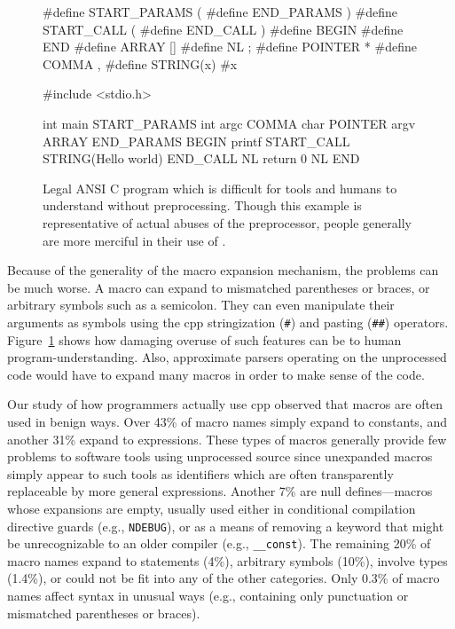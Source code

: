 \documentclass{article}
\newcommand{\Cpp}{\mbox{\textsf{cpp}}}
\newcommand{\C}{\mbox{C}}
\newcommand{\eg}{e.g.,}
\begin{document}
\begin{figure}[hbtp]
\begin{center}
\begin{small}
\begin{pseudocode}[5.5in]
#define START_PARAMS (
#define END_PARAMS )
#define START_CALL (
#define END_CALL )
#define BEGIN {
#define END }
#define ARRAY []
#define NL ;
#define POINTER *
#define COMMA ,
#define STRING(x) #x

#include <stdio.h>

int main START_PARAMS int argc COMMA char POINTER argv ARRAY END_PARAMS BEGIN
  printf START_CALL STRING(Hello world\n) END_CALL NL
  return 0 NL
END
\end{pseudocode}
\end{small}
\caption{Legal ANSI \C{} program which is difficult for tools and humans
  to understand without preprocessing.  Though this example is
  representative of actual abuses of the preprocessor, people generally
  are more merciful in their use of \cpp{}.}
\label{fig:worstcase}
\end{center}
\end{figure}

Because of the generality of the macro expansion mechanism, the problems
can be much worse.  A macro can expand to mismatched parentheses or
braces, or arbitrary symbols such as a semicolon.  They can even
manipulate their arguments as symbols using the \Cpp{} stringization
(\texttt{\#}) and pasting (\texttt{\#\#}) operators.
Figure~\ref{fig:worstcase} shows how damaging overuse of such features
can be to human program-understanding.  Also, approximate parsers operating on
the unprocessed code would have to expand many macros in order to make
sense of the code.

Our study of how programmers actually use
\Cpp{} observed that macros are often used in benign ways.  Over 43\% of macro
names simply expand to constants, and another 31\% expand to
expressions.  These types of macros generally provide few problems to
software tools using unprocessed source since unexpanded macros simply
appear to such tools as identifiers which are often transparently
replaceable by more general expressions.  Another 7\% are null
defines---macros whose expansions are empty, usually used either in
conditional compilation directive guards (\eg{} \texttt{NDEBUG}), or as a means
of removing a keyword that might be unrecognizable to an older compiler
(\eg{} \texttt{\_\_const}).  The remaining 20\% of macro names expand to statements
(4\%), arbitrary symbols (10\%), involve types (1.4\%), or could not be
fit into any of the other categories.  Only 0.3\% of macro names affect syntax in
unusual ways (\eg{} containing only punctuation or mismatched
parentheses or braces).
\end{document}
